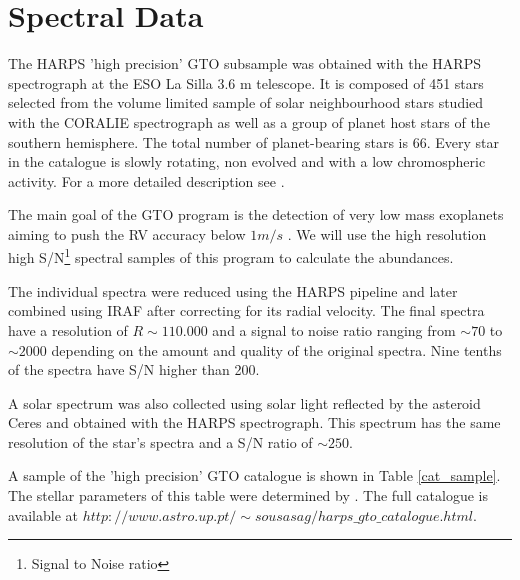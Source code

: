 \documentclass[dvips,12pt,a4paper]{report}
\begin{document}
{\section {Spectral Data}

The HARPS 'high precision' GTO subsample was obtained with the HARPS spectrograph at the ESO La Silla 3.6 m telescope. It is composed of 451 stars selected from the volume limited sample of solar neighbourhood stars studied with the CORALIE spectrograph \citep{Udry-2000} as well as a group of planet host stars of the southern hemisphere. The total number of planet-bearing stars is 66. Every star in the catalogue is slowly rotating, non evolved and with a low chromospheric activity. For a more detailed description see \citet{Sousa-2008}.

The main goal of the GTO program is the detection of very low mass exoplanets aiming to push the RV accuracy below  $1m/s$ \citep{Mayor-2003b}. We will use the high resolution high S/N\footnote{Signal to Noise ratio} spectral samples of this program to calculate the abundances. 

The individual spectra were reduced using the HARPS pipeline and later combined using IRAF after correcting for its radial velocity. The final spectra have a resolution of $R\sim110.000$ and a signal to noise ratio ranging from $\sim70$ to $\sim2000$ depending on the amount and quality of the original spectra. Nine tenths of the spectra have S/N higher than 200.


A solar spectrum was also collected using solar light reflected by the asteroid Ceres and obtained with the HARPS spectrograph. This spectrum has the same resolution of the star's spectra and a S/N ratio of $\sim250$. 

A sample of the 'high precision' GTO catalogue is shown in Table \ref{cat_sample}. The stellar parameters of this table were determined by \citet{Sousa-2008}. The full catalogue is available at $http://www.astro.up.pt/\sim sousasag/harps\_gto\_catalogue.html$. 

}
\end{document}
